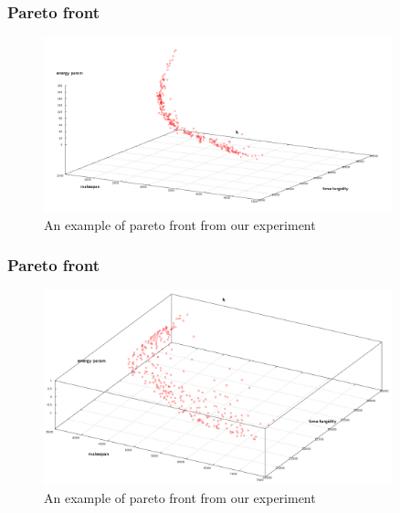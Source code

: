 \documentclass{beamer}
\begin{document}
\begin{frame}[label=paretofrnt]
 \frametitle{Pareto front}
\begin{figure}[t]
 \begin{center}
  \includegraphics[width=0.90\textwidth]{imgs/pareto}
 \end{center}
  \caption{An example of pareto front from our experiment \hyperlink{back4}{}}
\end{figure}
\end{frame}

\begin{frame}[label=paretofrnt1]
 \frametitle{Pareto front}
\begin{figure}[t]
 \begin{center}
  \includegraphics[width=0.90\textwidth]{imgs/pareto2}
 \end{center}
  \caption{An example of pareto front from our experiment \hyperlink{back4}{}}
\end{figure}
\end{frame}
\end{document}
